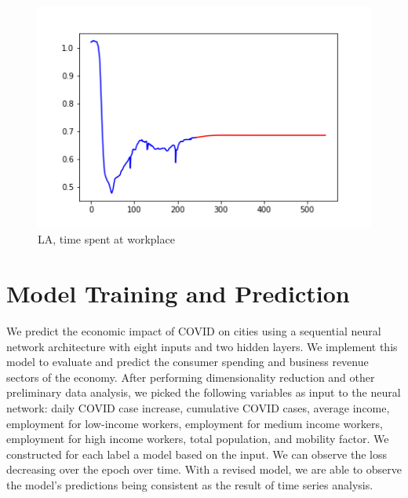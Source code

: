\documentclass{article}
\begin{document}
\begin{figure}[ht]
\begin{minipage}[b]{0.3\linewidth}
\includegraphics[width=\textwidth]{LA_time_at_workplace.png}
\caption{LA, time spent at workplace}
\end{minipage}
\end{figure}

\section{Model Training and Prediction}
We predict the economic impact of COVID on cities using a sequential neural network architecture with eight inputs and two hidden layers. We implement this model to evaluate and predict the consumer spending and business revenue sectors of the economy. After performing dimensionality reduction and other preliminary data analysis, we picked the following variables as input to the neural network: daily COVID case increase, cumulative COVID cases, average income, employment for low-income workers, employment for medium income workers, employment for high income workers, total population, and mobility factor. We constructed for each label a model based on the input. We can observe the loss decreasing over the epoch over time. With a revised model, we are able to observe the model's predictions being consistent as the result of time series analysis.
\end{document}
